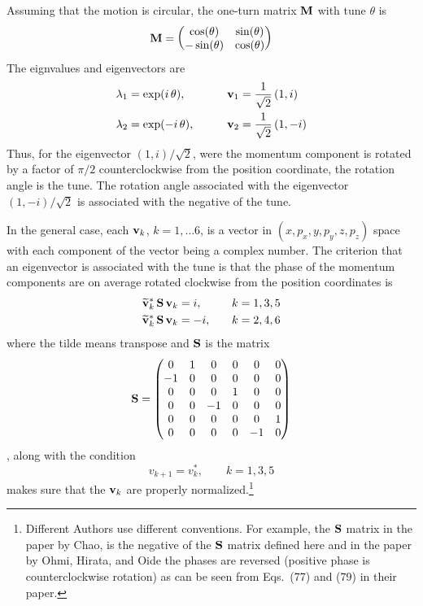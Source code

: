 Assuming that the motion is circular, the one-turn matrix ${\bf M}$ with tune $\theta$ is
\begin{equation}
  {\bf M} = \begin{pmatrix}
    \cos(\theta) & \sin(\theta) \\
   -\sin(\theta) & \cos(\theta)
  \end{pmatrix}
  \label{mctst}
\end{equation}
The eignvalues and eigenvectors are
\begin{alignat}{2}
  \lambda_1 &= \exp( i \, \theta),  \qquad &&{\bf v}_1 = \frac{1}{\sqrt{2}} \, (1, i) \nonumber \\
  \lambda_2 &= \exp(-i \, \theta),  \qquad &&{\bf v}_2 = \frac{1}{\sqrt{2}} \, (1, -i) 
\end{alignat}
Thus, for the eigenvector $(1, i)/\sqrt{2}$, were the momentum component is rotated by a factor
of $\pi/2$ counterclockwise from the position coordinate, the rotation angle is the tune. The
rotation angle associated with the eigenvector $(1, -i)/\sqrt{2}$ is associated with the negative of
the tune.

In the general case, each ${\bf v}_k$, $k = 1, \ldots 6$, is a vector in $(x, p_x, y, p_y, z, p_z)$
space with each component of the vector being a complex number. The criterion that an eigenvector
is associated with the tune is that the phase of the momentum components are on average rotated
clockwise from the position coordinates is
\begin{alignat}{2}
  \widetilde{{\bf v}}_{k}^* \, {\bf S} \, {\bf v}_k &=  i, \quad &&k = 1, 3, 5 \nonumber \\
  \widetilde{{\bf v}}_{k}^* \, {\bf S} \, {\bf v}_k &= -i, \quad &&k = 2, 4, 6
  \label{vsvi0}
\end{alignat}
where the tilde means transpose and ${\bf S}$ is the matrix
\begin{equation}
  {\bf S} = \begin{pmatrix}
      0 &  1 &  0 &  0 &  0 &  0 \\
     -1 &  0 &  0 &  0 &  0 &  0 \\
      0 &  0 &  0 &  1 &  0 &  0 \\
      0 &  0 & -1 &  0 &  0 &  0 \\
      0 &  0 &  0 &  0 &  0 &  1 \\
      0 &  0 &  0 &  0 & -1 &  0 \\
  \end{pmatrix}
  \label{s010000}
\end{equation}
, along with the condition 
\begin{equation}
  v_{k+1} = v_k^*, \qquad k = 1, 3, 5
  \label{vv135}
\end{equation}
makes sure that the ${\bf v}_k$ are properly normalized.\footnote
  {
Different Authors use different conventions. For example, the ${\bf S}$ matrix in the paper by
Chao\cite{b:chao.spin}, is the negative of the ${\bf S}$ matrix defined here and in the paper by Ohmi,
Hirata, and Oide \cite{b:ohmi} the phases are reversed (positive phase is counterclockwise rotation)
as can be seen from Eqs.~(77) and (79) in their paper.
  }


